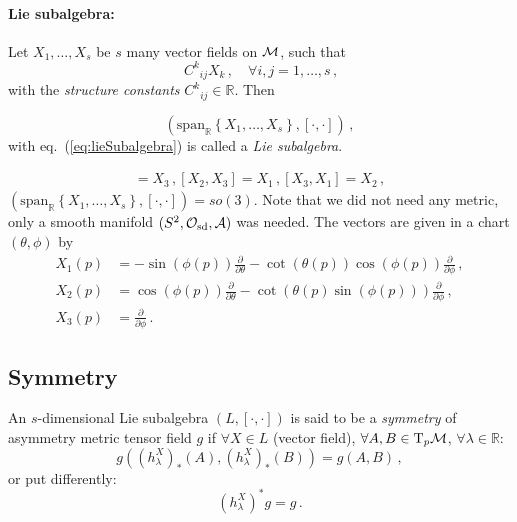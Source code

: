     \paragraph{Lie subalgebra:}
    Let $X_1, \ldots, X_s$ be $s$ many vector fields on $\mathcal{M}$, such that
    \begin{equation}
        [X_i, X_j] \ C^k{}_{ij} X_k\,,\quad\forall i,j=1,\ldots,s\,,
        \label{eq:lieSubalgebra}
    \end{equation}
    with the \textit{structure constants} $C^k{}_{ij}\in\mathbb{R}$.
    Then
    \begin{defn}
        \begin{equation}
            (\mathrm{span}_\mathbb{R}\left\{ X_1,\ldots,X_s \right\}, [\cdot,\cdot])\,,
        \end{equation}
        with eq.~(\ref{eq:lieSubalgebra}) is called a \textit{Lie subalgebra}.
    \end{defn}
    \begin{example}[(on $S^2$)]
        \begin{align*}
            [X_1, X_2] = X_3\,,
            [X_2, X_3] = X_1\,,
            [X_3, X_1] = X_2\,,
        \end{align*}
        $(\mathrm{span}_\mathbb{R}\left\{ X_1,\ldots,X_s \right\}, [\cdot,\cdot])=so(3)$.
        Note that we did not need any metric, only a smooth manifold $(S^2, \mathcal{O}_\text{sd}, \mathcal{A})$ was needed.
        The vectors are given in a chart $(\theta, \phi)$ by
        \begin{align*}
            X_1(p) &=  -\sin\left( \phi(p) \right)\frac{\partial}{\partial \theta} -
            \cot\left( \theta(p) \right) \cos\left( \phi(p) \right)\frac{\partial}{\partial \phi}\,,\\
            X_2(p) &= \cos\left( \phi(p) \right)\frac{\partial}{\partial \theta} - 
            \cot\left( \theta(p) \sin\left( \phi(p) \right) \right)\frac{\partial}{\partial \phi}\,,\\
            X_3(p) &= \frac{\partial}{\partial \phi}\,.
        \end{align*}
    \end{example}

    \subsection{Symmetry}
    \begin{defn}
        An $s$-dimensional Lie subalgebra $(L, [\cdot,\cdot])$ is said to be a
        \textit{symmetry} of asymmetry metric tensor field $g$ if
        $\forall X\in L$ (vector field), $\forall A,B \in \T_p\M$,
        $\forall \lambda \in \mathbb{R}$:
        \begin{equation}
            g\left( (h^X_\lambda)_* (A), (h^X_\lambda)_*(B) \right) = g(A,B)\,,
        \end{equation}
        or put differently:
        \begin{equation}
            (h^X_\lambda)^* g = g\,.
        \end{equation}
    \end{defn}

